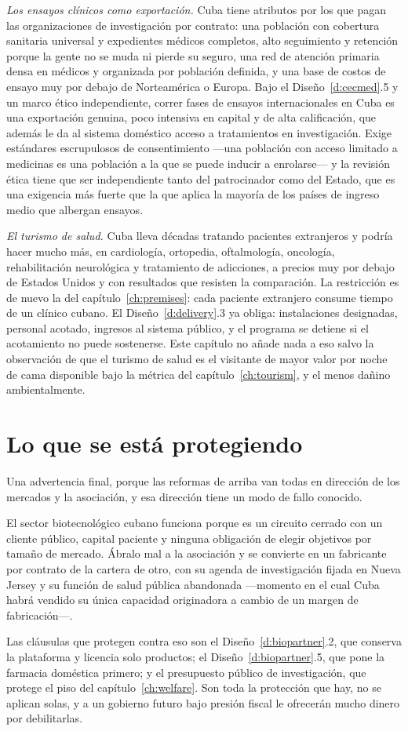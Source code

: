 \emph{Los ensayos clínicos como exportación.} Cuba tiene atributos por los que pagan las
organizaciones de investigación por contrato: una población con cobertura sanitaria universal
y expedientes médicos completos, alto seguimiento y retención porque la gente no se muda ni
pierde su seguro, una red de atención primaria densa en médicos y organizada por población
definida, y una base de costos de ensayo muy por debajo de Norteamérica o Europa. Bajo el
Diseño~\ref{d:cecmed}.5 y un marco ético independiente, correr fases de ensayos
internacionales en Cuba es una exportación genuina, poco intensiva en capital y de alta
calificación, que además le da al sistema doméstico acceso a tratamientos en investigación.
Exige estándares escrupulosos de consentimiento ---una población con acceso limitado a
medicinas es una población a la que se puede inducir a enrolarse--- y la revisión ética tiene
que ser independiente tanto del patrocinador como del Estado, que es una exigencia más fuerte
que la que aplica la mayoría de los países de ingreso medio que albergan ensayos.

\emph{El turismo de salud.} Cuba lleva décadas tratando pacientes extranjeros y podría hacer
mucho más, en cardiología, ortopedia, oftalmología, oncología, rehabilitación neurológica y
tratamiento de adicciones, a precios muy por debajo de Estados Unidos y con resultados que
resisten la comparación. La restricción es de nuevo la del capítulo~\ref{ch:premises}: cada
paciente extranjero consume tiempo de un clínico cubano. El Diseño~\ref{d:delivery}.3 ya
obliga: instalaciones designadas, personal acotado, ingresos al sistema público, y el programa
se detiene si el acotamiento no puede sostenerse. Este capítulo no añade nada a eso salvo la
observación de que el turismo de salud es el visitante de mayor valor por noche de cama
disponible bajo la métrica del capítulo~\ref{ch:tourism}, y el menos dañino ambientalmente.

\section{Lo que se está protegiendo}

Una advertencia final, porque las reformas de arriba van todas en dirección de los mercados y
la asociación, y esa dirección tiene un modo de fallo conocido.

El sector biotecnológico cubano funciona porque es un circuito cerrado con un cliente público,
capital paciente y ninguna obligación de elegir objetivos por tamaño de mercado. Ábralo mal a
la asociación y se convierte en un fabricante por contrato de la cartera de otro, con su
agenda de investigación fijada en Nueva Jersey y su función de salud pública abandonada
---momento en el cual Cuba habrá vendido su única capacidad originadora a cambio de un margen
de fabricación---.

Las cláusulas que protegen contra eso son el Diseño~\ref{d:biopartner}.2, que conserva la
plataforma y licencia solo productos; el Diseño~\ref{d:biopartner}.5, que pone la farmacia
doméstica primero; y el presupuesto público de investigación, que protege el piso del
capítulo~\ref{ch:welfare}. Son toda la protección que hay, no se aplican solas, y a un
gobierno futuro bajo presión fiscal le ofrecerán mucho dinero por debilitarlas.
